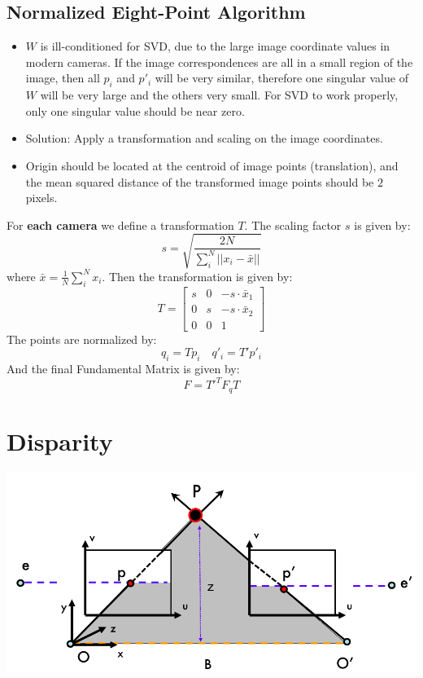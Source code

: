 \documentclass[8pt, a4paper, landscape, includeheadfoot]{extarticle}
\begin{document}
\begin{multicols*}{4}
	\subsection{Normalized Eight-Point Algorithm}
	\begin{itemize}[itemsep=0pt, leftmargin=8pt]
		\item $W$ is ill-conditioned for SVD, due to the large image coordinate values in modern cameras. If the image correspondences are all in a small region of the image, then all $p_i$ and $p'_i$ will be very similar, therefore one singular value of $W$ will be very large and the others very small. For SVD to work properly, only one singular value should be near zero.
		\item Solution: Apply a transformation and scaling on the image coordinates.
		\item Origin should be located at the centroid of image points (translation), and the mean squared distance of the transformed image points should be $2$ pixels.
	\end{itemize}
	For \textbf{each camera} we define a transformation $T$. The scaling factor $s$ is given by:
	$$
		s = \sqrt{\frac{2N}{\sum_{i}^{N} || x_i - \bar{x} ||}}
	$$
	where $\bar{x} = \frac{1}{N}\sum_{i}^{N} x_i$. Then the transformation is given by:
	$$
		T = \begin{bmatrix}
			s & 0 & -s \cdot \bar{x}_1 \\
			0 & s & -s \cdot \bar{x}_2 \\
			0 & 0 & 1
		\end{bmatrix}
	$$
	The points are normalized by:
	$$
		q_i = Tp_i \quad q'_i = T'p'_i
	$$
	And the final Fundamental Matrix is given by:
	$$
		F = T'^T F_q T
	$$

	\section{Disparity}

	\begin{center}
		\includegraphics[width=\linewidth]{0_images/disparity.png}
	\end{center}


\end{multicols*}
\end{document}
